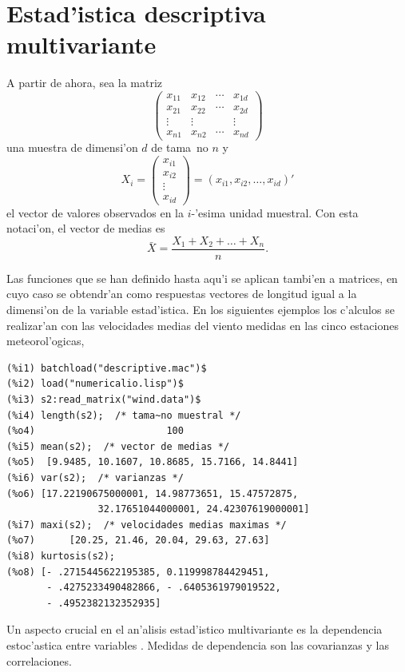 \documentclass[spanish,12pt,a4paper]{article}
\begin{document}
\section{Estad'istica descriptiva multivariante}


A partir de ahora, sea la matriz
\[
\left(
\begin{array}{cccc}
x_{11}  &  x_{12}  &  \cdots  &  x_{1d}  \\
x_{21}  &  x_{22}  &  \cdots  &  x_{2d}  \\
\vdots  &  \vdots  &          &  \vdots  \\
x_{n1}  &  x_{n2}  &  \cdots  &  x_{nd}
\end{array}
\right)
\]
una muestra de dimensi'on $d$ de tama~no $n$ y
\[
X_i =
\left(
\begin{array}{c}
x_{i1}  \\  x_{i2}  \\  \vdots  \\  x_{id}
\end{array}
\right) = (x_{i1}, x_{i2}, \ldots, x_{id})'
\]
el vector de valores observados en la $i$-'esima unidad muestral. Con esta notaci'on, el vector de medias es
\[
\bar{X} = \frac{X_1 + X_2 + \ldots +X_n}{n}.
\]

Las funciones que se han definido hasta aqu'i se aplican tambi'en a matrices, en cuyo caso se obtendr'an como respuestas vectores de longitud igual a la dimensi'on de la variable estad'istica. En los siguientes ejemplos los c'alculos se realizar'an con las velocidades medias del viento medidas en las cinco estaciones meteorol'ogicas,
\begin{verbatim}
(%i1) batchload("descriptive.mac")$
(%i2) load("numericalio.lisp")$
(%i3) s2:read_matrix("wind.data")$
(%i4) length(s2);  /* tama~no muestral */
(%o4)                       100
(%i5) mean(s2);  /* vector de medias */
(%o5)  [9.9485, 10.1607, 10.8685, 15.7166, 14.8441]
(%i6) var(s2);  /* varianzas */
(%o6) [17.22190675000001, 14.98773651, 15.47572875,
                32.17651044000001, 24.42307619000001]
(%i7) maxi(s2);  /* velocidades medias maximas */
(%o7)      [20.25, 21.46, 20.04, 29.63, 27.63]
(%i8) kurtosis(s2);
(%o8) [- .2715445622195385, 0.119998784429451,
       - .4275233490482866, - .6405361979019522,
       - .4952382132352935]
\end{verbatim}

Un aspecto crucial en el an'alisis estad'istico multivariante es la dependencia estoc'astica entre variables \cite{john,pena}. Medidas de dependencia son las covarianzas y las correlaciones.
\end{document}
